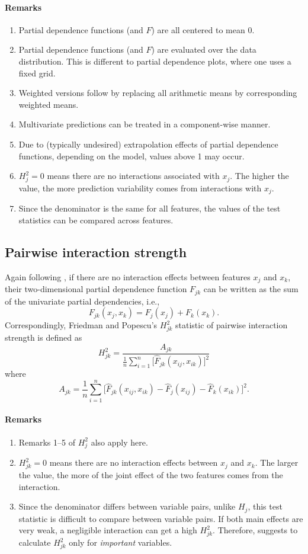 \documentclass[]{article}
\begin{document}
\paragraph{Remarks}
\begin{enumerate}
	\item Partial dependence functions (and $F$) are all centered to mean 0.
	\item Partial dependence functions (and $F$) are evaluated over the data distribution. This is different to partial dependence plots, where one uses a fixed grid.
	\item Weighted versions follow by replacing all arithmetic means by corresponding weighted means.
	\item Multivariate predictions can be treated in a component-wise manner.
	\item Due to (typically undesired) extrapolation effects of partial dependence functions, depending on the model, values above 1 may occur.
	\item $H^2_j = 0$ means there are no interactions associated with $x_j$. The higher the value, the more prediction variability comes from interactions with $x_j$.
	\item Since the denominator is the same for all features, the values of the test statistics can be compared across features.
\end{enumerate}

\subsection{Pairwise interaction strength}
Again following \cite{friedman2008}, if there are no interaction effects between features $x_j$ and $x_k$, their two-dimensional partial dependence function $F_{jk}$ can be written as the sum of the univariate partial dependencies, i.e.,
$$
  F_{jk}(x_j, x_k) = F_j(x_j)+ F_k(x_k).
$$
Correspondingly, Friedman and Popescu's $H_{jk}^2$ statistic of pairwise interaction strength is defined as
$$
  H_{jk}^2 = \frac{A_{jk}}{\frac{1}{n} \sum_{i = 1}^n\big[\hat F_{jk}(x_{ij}, x_{ik})\big]^2}
$$
where 
$$
  A_{jk} = \frac{1}{n} \sum_{i = 1}^n\big[\hat F_{jk}(x_{ij}, x_{ik}) - \hat F_j(x_{ij}) - \hat F_k(x_{ik})\big]^2.
$$
\paragraph{Remarks}
\begin{enumerate}
	\item Remarks 1--5 of $H^2_{j}$ also apply here.
	\item $H^2_{jk} = 0$ means there are no interaction effects between $x_j$ and $x_k$. The larger the value, the more of the joint effect of the two features comes from the interaction.
	\item Since the denominator differs between variable pairs, unlike $H_j$, this test statistic is difficult to compare between variable pairs. If both main effects are very weak, a negligible interaction can get a high $H^2_{jk}$. Therefore, \cite{friedman2008} suggests to calculate $H^2_{jk}$ only for {\em important} variables.
\end{enumerate}
\end{document}
